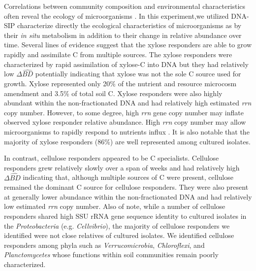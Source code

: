 Correlations between community composition and environmental characteristics
often reveal the ecology of microorganisms \citep{Fierer2007}. In this experiment,we utilized
DNA-SIP characterize directly the ecological characteristics of microorganisms
as by their \textit{in situ} metabolism in addition to their change in relative
abundance over time. Several lines of evidence suggest that the xylose
responders are able to grow rapidly and assimilate C from
multiple sources. The xylose responders were characterized by rapid
assimilation of xylose-C into DNA but they had relatively low $\Delta\hat{BD}$
potentially indicating that xylose was not the sole C source used for growth.
Xylose represented only 20\% of the nutrient and resource microcosm amendment
and 3.5\% of total soil C. Xylose responders were also highly
abundant within the non-fractionated DNA and had relatively high estimated
\textit{rrn} copy number. However, to some degree, high \textit{rrn} gene copy
number may inflate observed xylose responder relative abundance. High
\textit{rrn} copy number may allow microorganisms to rapidly respond to
nutrients influx \citep{Klappenbach_2000}. It is also notable that the
majority of xylose responders (86\%) are well represented among cultured
isolates. 

In contrast, cellulose responders appeared to be C specialists.
Cellulose responders grew relatively slowly over a span of weeks and had
relatively high $\Delta\hat{BD}$ indicating that, although multiple sources of
C were present, cellulose remained the dominant C source for cellulose
responders. They were also present at generally lower abundance within the
non-fractionated DNA and had relatively low estimated \textit{rrn} copy number.
Also of note, while a number of cellulose responders shared high SSU rRNA gene
sequence identity to cultured isolates in the \textit{Proteobacteria} (e.g.
\textit{Cellvibrio}), the majority of cellulose responders we identified were
not close relatives of cultured isolates. We identified cellulose responders
among phyla such as \textit{Verrucomicrobia}, \textit{Chloroflexi}, and
\textit{Planctomycetes} whose functions within soil communities remain poorly
characterized.

